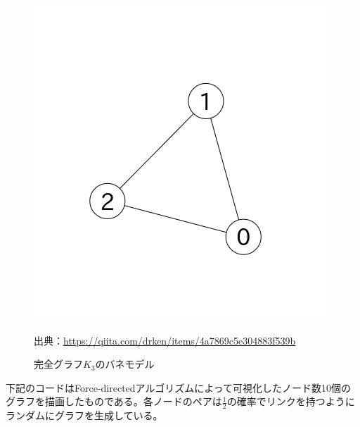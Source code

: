 \documentclass[dvipdfmx]{jsarticle}
\begin{document}
\begin{figure}[H]
  \centering
  \includegraphics[scale=0.4]{images/K3result.png}
  \caption{完全グラフ$K_{3}$のバネモデル}
  出典：\url{https://qiita.com/drken/items/4a7869c5e304883f539b}
\end{figure}
下記のコードはForce-directedアルゴリズムによって可視化したノード数10個のグラフを描画したものである。各ノードのペアは$\frac{1}{2}$の確率でリンクを持つようにランダムにグラフを生成している。
\end{document}
